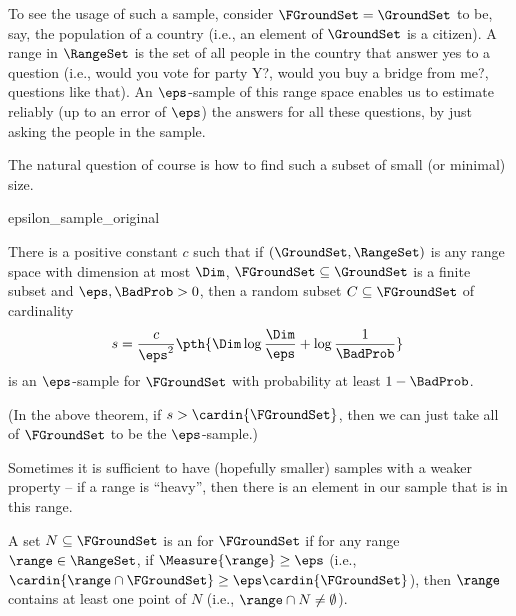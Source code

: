 To see the usage of such a sample, consider $\FGroundSet = \GroundSet$
to be, say, the population of a country (i.e., an element of
$\GroundSet$ is a citizen). A range in $\RangeSet$ is the set of all
people in the country that answer yes to a question (i.e., would you
vote for party Y?, would you buy a bridge from me?, questions like
that). An $\eps$-sample of this range space enables us to estimate
reliably (up to an error of $\eps$) the answers for all these
questions, by just asking the people in the sample.

The natural question of course is how to find such a subset of small
(or minimal) size.

\begin{fragment}{epsilon_sample_original}
    \begin{theorem}
        There is a positive constant $c$ such that if
        $(\GroundSet,\RangeSet)$ is any range space with \VC dimension
        at most $\Dim$, $\FGroundSet \subseteq \GroundSet$ is a finite
        subset and $\eps, \BadProb > 0$, then a random subset
        $C\subseteq \FGroundSet$ of cardinality
        \begin{align*}
          s = \frac{c}{\eps^2} \pth{ \Dim \log \frac{\Dim}{\eps} +
          \log\frac{1}{\BadProb}}\
        \end{align*}
        is an $\eps$-sample for $\FGroundSet$ with probability at
        least $1-\BadProb$.                
    \end{theorem}
\end{fragment}

(In the above theorem, if $s > \cardin{\FGroundSet}$, then we can just
take all of $\FGroundSet$ to be the $\eps$-sample.)

\medskip


Sometimes it is sufficient to have (hopefully smaller) samples with a
weaker property -- if a range is ``heavy'', then there is an element in
our sample that is in this range.

\begin{defn}
    A set $N \subseteq \FGroundSet$ is an
     for $\FGroundSet$ if
    for any range $\range \in \RangeSet$, if $\Measure{\range} \geq
    \eps$ (i.e., $\cardin{\range \cap \FGroundSet} \geq \eps
    \cardin{\FGroundSet}$), then $\range$ contains at least one point
    of $N$ (i.e., $\range \cap N \ne \emptyset$).
\end{defn}

